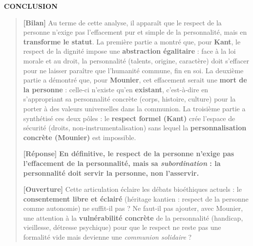 \documentclass[11pt]{article}
\begin{document}
\begin{exoresolu}
\textbf{CONCLUSION}
\begin{quote}
\textbf{[Bilan]} Au terme de cette analyse, il apparaît que le respect de la personne n'exige pas l'effacement pur et simple de la personnalité, mais en \textbf{transforme le statut}. La première partie a montré que, pour \textbf{Kant}, le respect de la dignité impose une \textbf{abstraction égalitaire} : face à la loi morale et au droit, la personnalité (talents, origine, caractère) doit s'effacer pour ne laisser paraître que l'humanité commune, fin en soi. La deuxième partie a démontré que, pour \textbf{Mounier}, cet effacement serait une \textbf{mort de la personne} : celle-ci n'existe qu'en \textbf{existant}, c'est-à-dire en s'appropriant sa personnalité concrète (corps, histoire, culture) pour la porter à des valeurs universelles dans la communion. La troisième partie a synthétisé ces deux pôles : le \textbf{respect formel (Kant)} crée l'espace de sécurité (droits, non-instrumentalisation) sans lequel la \textbf{personnalisation concrète (Mounier)} est impossible.

\textbf{[Réponse]} \textbf{En définitive, le respect de la personne n'exige pas l'effacement de la personnalité, mais sa \emph{subordination} : la personnalité doit servir la personne, non l'asservir.}

\textbf{[Ouverture]} Cette articulation éclaire les débats bioéthiques actuels : le \textbf{consentement libre et éclairé} (héritage kantien : respect de la personne comme autonomie) ne suffit-il pas ? Ne faut-il pas ajouter, avec Mounier, une attention à la \textbf{vulnérabilité concrète} de la personnalité (handicap, vieillesse, détresse psychique) pour que le respect ne reste pas une formalité vide mais devienne une \emph{communion solidaire} ?
\end{quote}
\end{exoresolu}
\end{document}
